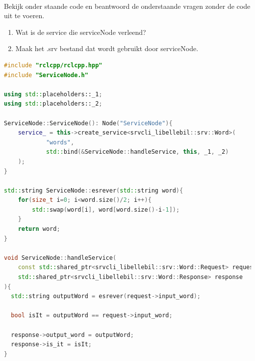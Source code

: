\begin{exercise}[Libellebil]\mbox{}\\
Bekijk onder staande code en beantwoord de onderstaande vragen zonder de code uit te voeren.

\begin{enumerate}
    \item Wat is de service die serviceNode verleend?
    \item Maak het .srv bestand dat wordt gebruikt door serviceNode.
\end{enumerate}

\begin{minipage}{0.9\linewidth}
\begin{lstlisting}[language=C++, firstnumber=0]
#include "rclcpp/rclcpp.hpp"
#include "ServiceNode.h"

using std::placeholders::_1;
using std::placeholders::_2;

ServiceNode::ServiceNode(): Node("ServiceNode"){
    service_ = this->create_service<srvcli_libellebil::srv::Word>(
            "words", 
            std::bind(&ServiceNode::handleService, this, _1, _2)
    );
}

std::string ServiceNode::esrever(std::string word){
    for(size_t i=0; i<word.size()/2; i++){    
        std::swap(word[i], word[word.size()-i-1]);
    }
    return word;
}

void ServiceNode::handleService( 
    const std::shared_ptr<srvcli_libellebil::srv::Word::Request> request,
    std::shared_ptr<srvcli_libellebil::srv::Word::Response> response
){
  std::string outputWord = esrever(request->input_word);

  bool isIt = outputWord == request->input_word;

  response->output_word = outputWord;
  response->is_it = isIt;
}
\end{lstlisting}
\end{minipage}


\end{exercise}

